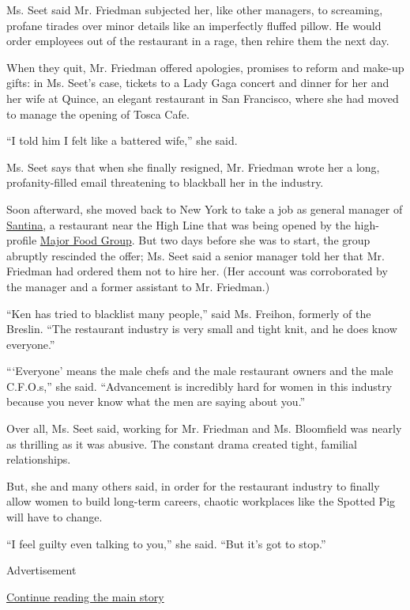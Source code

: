 Ms. Seet said Mr. Friedman subjected her, like other managers, to
screaming, profane tirades over minor details like an imperfectly
fluffed pillow. He would order employees out of the restaurant in a
rage, then rehire them the next day.

When they quit, Mr. Friedman offered apologies, promises to reform and
make-up gifts: in Ms. Seet's case, tickets to a Lady Gaga concert and
dinner for her and her wife at Quince, an elegant restaurant in San
Francisco, where she had moved to manage the opening of Tosca Cafe.

``I told him I felt like a battered wife,'' she said.

Ms. Seet says that when she finally resigned, Mr. Friedman wrote her a
long, profanity-filled email threatening to blackball her in the
industry.

Soon afterward, she moved back to New York to take a job as general
manager of
\href{https://www.nytimes.com/2015/04/22/dining/restaurant-review-santina-in-the-meatpacking-district.html}{Santina},
a restaurant near the High Line that was being opened by the
high-profile \href{https://www.majorfood.com/}{Major Food Group}. But
two days before she was to start, the group abruptly rescinded the
offer; Ms. Seet said a senior manager told her that Mr. Friedman had
ordered them not to hire her. (Her account was corroborated by the
manager and a former assistant to Mr. Friedman.)

``Ken has tried to blacklist many people,'' said Ms. Freihon, formerly
of the Breslin. ``The restaurant industry is very small and tight knit,
and he does know everyone.''

```Everyone' means the male chefs and the male restaurant owners and the
male C.F.O.s,'' she said. ``Advancement is incredibly hard for women in
this industry because you never know what the men are saying about
you.''

Over all, Ms. Seet said, working for Mr. Friedman and Ms. Bloomfield was
nearly as thrilling as it was abusive. The constant drama created tight,
familial relationships.

But, she and many others said, in order for the restaurant industry to
finally allow women to build long-term careers, chaotic workplaces like
the Spotted Pig will have to change.

``I feel guilty even talking to you,'' she said. ``But it's got to
stop.''

Advertisement

\protect\hyperlink{after-bottom}{Continue reading the main story}

